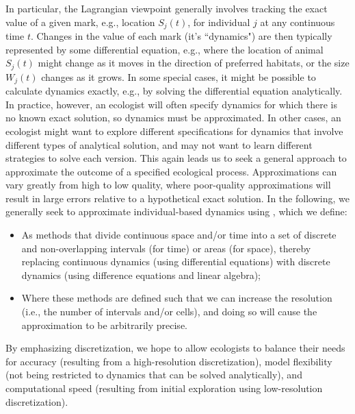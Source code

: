In particular, the Lagrangian viewpoint generally involves tracking the exact value of a given mark, e.g., location \( S_j(t) \), for individual \(j\) at any continuous time \(t\).  Changes in the value of each mark (it's ``dynamics") are then typically represented by some differential equation, e.g., where the location of animal \(S_j(t) \) might change as it moves in the direction of preferred habitats, or the size \( W_j(t) \) changes as it grows. In some special cases, it might be possible to calculate dynamics exactly, e.g., by solving the  differential equation analytically.  In practice, however, an ecologist will often specify dynamics for which there is no known exact solution, so dynamics must be approximated.  In other cases, an ecologist might want to explore different specifications for dynamics that involve different types of analytical solution, and may not want to learn different strategies to solve each version.  This again leads us to seek a general approach to approximate the outcome of a specified ecological process.  Approximations can vary greatly from high to low quality, where poor-quality approximations will result in large errors relative to a hypothetical exact solution.  In the following, we generally seek to approximate individual-based dynamics using , which we define:
\begin{itemize}
    \item As methods that divide continuous space and/or time into a set of discrete and non-overlapping intervals (for time) or areas (for space), thereby replacing continuous dynamics (using differential equations) with discrete dynamics (using difference equations and linear algebra); 

    \item Where these methods are defined such that we can increase the resolution (i.e., the number of intervals and/or cells), and doing so will cause the approximation to be arbitrarily precise.
\end{itemize}
By emphasizing discretization, we hope to allow ecologists to balance their needs for accuracy (resulting from a high-resolution discretization), model flexibility (not being restricted to dynamics that can be solved analytically), and computational speed (resulting from initial exploration using low-resolution discretization).  

